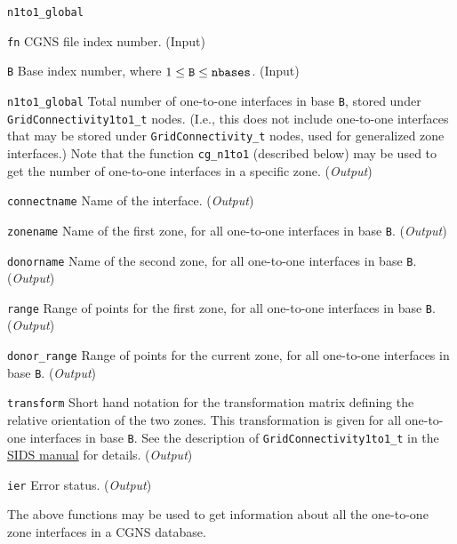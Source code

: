 \begin{Ventryi}{\texttt{n1to1\_global}}\raggedright
\item [\texttt{fn}]
      CGNS file index number.
      (\textcolor{input}{Input})
\item [\texttt{B}]
      Base index number, where $1 \leq \text{\texttt{B}} \leq \text{\texttt{nbases}}$.
      (\textcolor{input}{Input})
\item [\texttt{n1to1\_global}]
      Total number of one-to-one interfaces in base \texttt{B},
      stored under \texttt{GridConnectivity1to1\_t} nodes.
      (I.e., this does not include one-to-one interfaces that may be
      stored under \texttt{GridConnectivity\_t} nodes, used for
      generalized zone interfaces.)
      Note that the function \texttt{cg\_n1to1} (described below) may be
      used to get the number of one-to-one interfaces in a specific
      zone.
      (\textcolor{output}{\textit{Output}})
\item [\texttt{connectname}]
      Name of the interface.
      (\textcolor{output}{\textit{Output}})
\item [\texttt{zonename}]
      Name of the first zone, for all one-to-one interfaces in base
      \texttt{B}.
      (\textcolor{output}{\textit{Output}})
\item [\texttt{donorname}]
      Name of the second zone, for all one-to-one interfaces in base
      \texttt{B}.
      (\textcolor{output}{\textit{Output}})
\item [\texttt{range}]
      Range of points for the first zone, for all one-to-one interfaces
      in base \texttt{B}.
      (\textcolor{output}{\textit{Output}})
\item [\texttt{donor\_range}]
      Range of points for the current zone, for all one-to-one interfaces
      in base \texttt{B}.
      (\textcolor{output}{\textit{Output}})
\item [\texttt{transform}]
      Short hand notation for the transformation matrix defining the
      relative orientation of the two zones.
      This transformation is given for all one-to-one interfaces in
      base \texttt{B}.
      See the description of \texttt{GridConnectivity1to1\_t} in the
      \href{../sids/sids.pdf}{SIDS manual} for details.
      (\textcolor{output}{\textit{Output}})
\item [\texttt{ier}]
      Error status.
      (\textcolor{output}{\textit{Output}})
\end{Ventryi}

The above functions may be used to get information about all the
one-to-one zone interfaces in a CGNS database.

